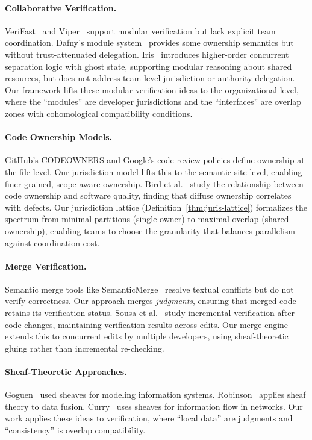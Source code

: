 \documentclass[11pt]{article}
\begin{document}
\paragraph{Collaborative Verification.}
VeriFast~\cite{jacobs2011verifast} and Viper~\cite{muller2016viper} support
modular verification but lack explicit team coordination. Dafny's
module system~\cite{leino2010dafny} provides some ownership semantics but
without trust-attenuated delegation. Iris~\cite{jung2018iris} introduces
higher-order concurrent separation logic with ghost state, supporting modular
reasoning about shared resources, but does not address team-level jurisdiction
or authority delegation. Our framework lifts these modular verification ideas
to the organizational level, where the ``modules'' are developer jurisdictions
and the ``interfaces'' are overlap zones with cohomological compatibility
conditions.

\paragraph{Code Ownership Models.}
GitHub's CODEOWNERS and Google's code review policies define ownership at the
file level. Our jurisdiction model lifts this to the semantic site level,
enabling finer-grained, scope-aware ownership. Bird et al.~\cite{bird2011ownership}
study the relationship between code ownership and software quality, finding
that diffuse ownership correlates with defects. Our jurisdiction lattice
(Definition~\ref{thm:juris-lattice}) formalizes the spectrum from minimal
partitions (single owner) to maximal overlap (shared ownership), enabling
teams to choose the granularity that balances parallelism against coordination
cost.

\paragraph{Merge Verification.}
Semantic merge tools like SemanticMerge~\cite{semanticmerge} resolve textual
conflicts but do not verify correctness. Our approach merges \emph{judgments},
ensuring that merged code retains its verification status. Sousa et
al.~\cite{sousa2018incremental} study incremental verification after code
changes, maintaining verification results across edits. Our merge engine
extends this to concurrent edits by multiple developers, using sheaf-theoretic
gluing rather than incremental re-checking.

\paragraph{Sheaf-Theoretic Approaches.}
Goguen~\cite{goguen1992sheaves} used sheaves for modeling information systems.
Robinson~\cite{robinson2014topological} applies sheaf theory to data fusion.
Curry~\cite{curry2014sheaves} uses sheaves for information flow in networks.
Our work applies these ideas to verification, where ``local data'' are judgments
and ``consistency'' is overlap compatibility.
\end{document}
